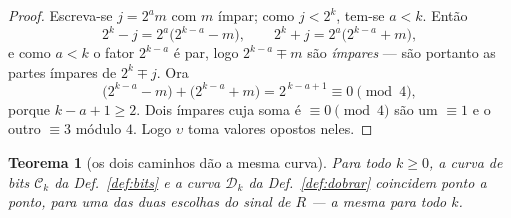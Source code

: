 \documentclass[11pt,a4paper]{article}
\newtheorem{teorema}{Teorema}
\begin{document}
\begin{proof}
Escreva-se $j=2^{a}m$ com $m$ ímpar; como $j<2^{k}$, tem-se $a<k$. Então
\[
2^{k}-j=2^{a}\bigl(2^{k-a}-m\bigr),\qquad
2^{k}+j=2^{a}\bigl(2^{k-a}+m\bigr),
\]
e como $a<k$ o fator $2^{k-a}$ é par, logo $2^{k-a}\mp m$ são \emph{ímpares} ---
são portanto as partes ímpares de $2^{k}\mp j$. Ora
\[
\bigl(2^{k-a}-m\bigr)+\bigl(2^{k-a}+m\bigr)=2^{\,k-a+1}\equiv0\pmod 4,
\]
porque $k-a+1\ge2$. Dois ímpares cuja soma é $\equiv0\pmod4$ são um $\equiv1$ e
o outro $\equiv3$ módulo $4$. Logo $\upsilon$ toma valores opostos neles.
\end{proof}

\begin{teorema}[os dois caminhos dão a mesma curva]\label{thm:dragao}
Para todo $k\ge0$, a curva de bits $\mathcal{C}_k$ da Def.~\ref{def:bits} e a curva
$\mathcal{D}_k$ da Def.~\ref{def:dobrar} coincidem ponto a ponto, para uma das duas
escolhas do sinal de $R$ --- a mesma para todo $k$.
\end{teorema}
\end{document}
